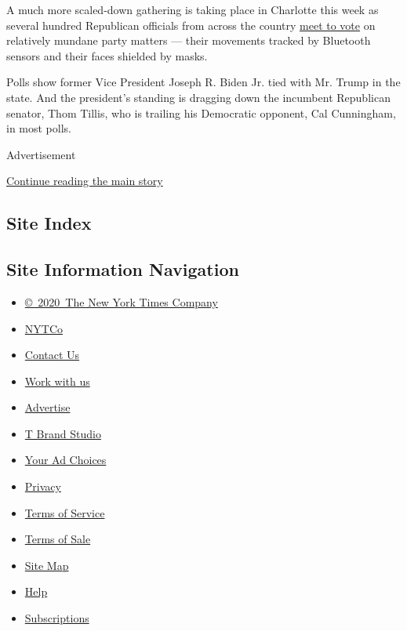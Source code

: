A much more scaled-down gathering is taking place in Charlotte this week
as several hundred Republican officials from across the country
\href{https://www.nytimes3xbfgragh.onion/2020/08/22/us/politics/Republican-delegates-charlotte-trump.html}{meet
to vote} on relatively mundane party matters --- their movements tracked
by Bluetooth sensors and their faces shielded by masks.

Polls show former Vice President Joseph R. Biden Jr. tied with Mr. Trump
in the state. And the president's standing is dragging down the
incumbent Republican senator, Thom Tillis, who is trailing his
Democratic opponent, Cal Cunningham, in most polls.

Advertisement

\protect\hyperlink{after-bottom}{Continue reading the main story}

\hypertarget{site-index}{%
\subsection{Site Index}\label{site-index}}

\hypertarget{site-information-navigation}{%
\subsection{Site Information
Navigation}\label{site-information-navigation}}

\begin{itemize}
\tightlist
\item
  \href{https://help.nytimes3xbfgragh.onion/hc/en-us/articles/115014792127-Copyright-notice}{©~2020~The
  New York Times Company}
\end{itemize}

\begin{itemize}
\tightlist
\item
  \href{https://www.nytco.com/}{NYTCo}
\item
  \href{https://help.nytimes3xbfgragh.onion/hc/en-us/articles/115015385887-Contact-Us}{Contact
  Us}
\item
  \href{https://www.nytco.com/careers/}{Work with us}
\item
  \href{https://nytmediakit.com/}{Advertise}
\item
  \href{http://www.tbrandstudio.com/}{T Brand Studio}
\item
  \href{https://www.nytimes3xbfgragh.onion/privacy/cookie-policy\#how-do-i-manage-trackers}{Your
  Ad Choices}
\item
  \href{https://www.nytimes3xbfgragh.onion/privacy}{Privacy}
\item
  \href{https://help.nytimes3xbfgragh.onion/hc/en-us/articles/115014893428-Terms-of-service}{Terms
  of Service}
\item
  \href{https://help.nytimes3xbfgragh.onion/hc/en-us/articles/115014893968-Terms-of-sale}{Terms
  of Sale}
\item
  \href{https://spiderbites.nytimes3xbfgragh.onion}{Site Map}
\item
  \href{https://help.nytimes3xbfgragh.onion/hc/en-us}{Help}
\item
  \href{https://www.nytimes3xbfgragh.onion/subscription?campaignId=37WXW}{Subscriptions}
\end{itemize}
